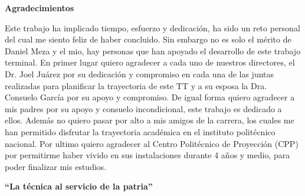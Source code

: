 




\begin{LARGE}
	\textbf{Agradecimientos}\\
\end{LARGE}



\begin{tcolorbox}[adjusted title=flush center,halign title=flush center,titlerule=3mm,title= \large{Carlos A. Hernandez G.}] 

Este trabajo ha implicado tiempo, esfuerzo y dedicación, ha sido un reto personal del cual me siento feliz de haber concluido. Sin embargo no es solo el mérito de Daniel Meza y el mio, hay personas que han apoyado el desarrollo de este trabajo terminal. En primer lugar quiero agradecer a cada uno de nuestros directores, el Dr. Joel Juárez por su dedicación y compromiso en cada una de las juntas realizadas para planificar la trayectoria de este TT y a su esposa la Dra. Consuelo García por su apoyo y compromiso. De igual forma quiero agradecer a mis padres por su apoyo y consuelo incondicional, este trabajo es dedicado a ellos. Además no quiero pasar por alto a mis amigos de la carrera, los cuales me han permitido disfrutar la trayectoria académica en el instituto politécnico nacional. Por ultimo quiero agradecer al Centro Politécnico de Proyección (CPP) por permitirme haber vivido en sus instalaciones durante 4 años y medio, para poder finalizar mis estudios.\\

\begin{center}\textbf{``La técnica al servicio de la patria''}\end{center}

\end{tcolorbox}
\ \\
